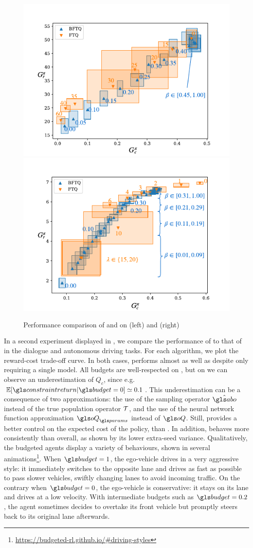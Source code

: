 \begin{figure}[th]
	\begin{center}
		\includegraphics[width=0.49\linewidth]{img/slot-filling}
		\includegraphics[width=0.49\linewidth]{img/highway}
		\caption{Performance comparison of \FTQl and \BFTQ on  (left) and (right) }
		\label{sec:brl-results}
	\end{center}
\end{figure}

In a second experiment displayed in , we compare the performance of \FTQl to that of \BFTQ in the dialogue and autonomous driving tasks. 
For each algorithm, we plot the reward-cost trade-off curve. In both cases, \BFTQ performs almost as well as \FTQl despite only requiring a single model. All budgets are well-respected on , but on  we can observe an underestimation of $Q_c$, since e.g. $\expectedvalue[\constraintreturn|\budget=0] \simeq 0.1 $. This underestimation can be a consequence of two approximations: the use of the sampling operator $\hat{\abo}$ instead of the true population operator $\mathcal{T}$, and the use of the neural network function approximation $\oQ_\params$ instead of $\oQ$.
Still, \BFTQ provides a better control on the expected cost of the policy, than \FTQl. In addition, \BFTQ behaves more consistently than \FTQl overall, as shown by its lower extra-seed variance.
Qualitatively, the budgeted agents display a variety of behaviours, shown in several animations\footnote{\href{https://budgeted-rl.github.io/\#driving-styles}{https://budgeted-rl.github.io/\#driving-styles}}. When $\budget = 1$, the ego-vehicle drives in a very aggressive style: it immediately switches to the opposite lane and drives as fast as possible to pass slower vehicles, swiftly changing lanes to avoid incoming traffic. On the contrary when $\budget = 0$, the ego-vehicle is conservative: it stays on its lane and drives at a low velocity. With intermediate budgets such as $\budget = 0.2$, the agent sometimes decides to overtake its front vehicle but promptly steers back to its original lane afterwards.

